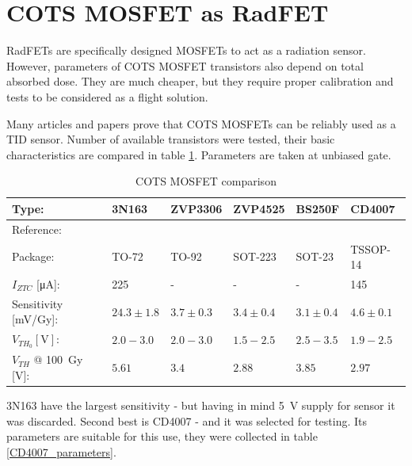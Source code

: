 \section{COTS MOSFET as RadFET}
    RadFETs are specifically designed MOSFETs to act as a radiation sensor. However, parameters of COTS MOSFET transistors also depend on total absorbed dose. They are much cheaper, but they require proper calibration and tests to be considered as a flight solution.

    Many articles and papers prove that COTS MOSFETs can be reliably used as a TID sensor. Number of available transistors were tested, their basic characteristics are compared in table \ref{cots_mosfet_comparison}. Parameters are taken at unbiased gate.

    \begin{table}[H]
    \begin{tabular}{| L{2cm} | C{2.4cm} | C{2.4cm} | C{2.4cm} | C{2.4cm} | C{2.4cm} |}
        \hline
        Type: & 3N163 & ZVP3306 & ZVP4525 & BS250F & CD4007 \\ \hline
        Reference: & \cite{3N163_article} & \cite{COTSMosfetsGarcia} & \cite{COTSMosfetsGarcia} & \cite{COTSMosfetsGarcia} & \cite{COTSMosfetsGarcia} \\ \hline

        Package: & TO-72 & TO-92 & SOT-223 & SOT-23 & TSSOP-14 \\ \hline

        $I_{ZTC}$ [\si{\micro\ampere}]: & 225 & - & - & - & 145 \\ \hline

        Sensitivity [\si{\milli\volt/\gray}]: & $24.3\pm 1.8$ & $3.7\pm 0.3$ & $3.4\pm 0.4$ & $3.1\pm 0.4$ & $4.6\pm 0.1$ \\ \hline

        $V_{TH_0} [\si{\volt}]$: & $2.0 - 3.0$ & $2.0 - 3.0$ & $1.5 - 2.5$ & $2.5 - 3.5$ & $1.9 - 2.5$ \\ \hline

        $V_{TH}$ @ \SI{100}{\gray} [\si{\volt}]: & $5.61$ & $3.4$ & $2.88$ & $3.85$ & $2.97$ \\ \hline
    \end{tabular}
    \caption{COTS MOSFET comparison}
    \label{cots_mosfet_comparison}
    \end{table}

    3N163 have the largest sensitivity - but having in mind \SI{5}{\volt} supply for sensor it was discarded. Second best is CD4007 - and it was selected for testing. Its parameters are suitable for this use, they were collected in table \ref{CD4007_parameters}.

